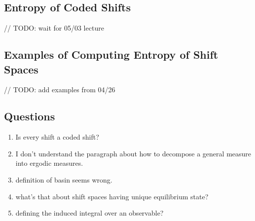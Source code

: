 \documentclass[11pt, reqno]{amsart}
\theoremstyle{plain}
\numberwithin{thm}{subsection}
\theoremstyle{definition}
\begin{document}
\subsection{Entropy of Coded Shifts}\cite[L12]{wolf}
// TODO: wait for 05/03 lecture

\subsection{Examples of Computing Entropy of Shift Spaces}
// TODO: add examples from 04/26

\subsection{Questions}
\begin{enumerate}
  \item Is every shift a coded shift?
  \item I don't understand the paragraph about how to decompose a general measure into ergodic measures.
  \item definition of basin seems wrong.
  \item what's that about shift spaces having unique equilibrium state?
  \item defining the induced integral over an observable?
\end{enumerate}
\newpage




\appendix
\end{document}
